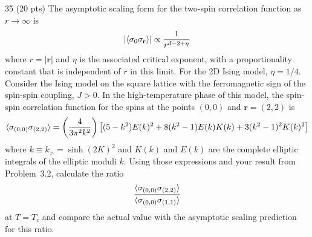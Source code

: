 \begin{hwproblem}{3}{5}
(20 pts) The asymptotic scaling form for the two-spin correlation function as $r\to\infty$ is
\begin{equation}
  |\langle \sigma_0\sigma_{\mathbf r}\rangle|\propto\frac{1}{r^{d-2+\eta}}
\end{equation}
where $r = |\mathbf r|$ and $\eta$ is the associated critical exponent, with a proportionality constant that is
independent of $r$ in this limit. For the 2D Ising model, $\eta = 1/4$. Consider the Ising model on the square lattice
with the ferromagnetic sign of the spin-spin coupling, $J>0$. In the high-temperature phase of this model, the
spin-spin correlation function for the spins at the points $(0,0)$ and $\mathbf r = (2,2)$ is
\begin{equation}
  \langle \sigma_{(0,0)}\sigma_{(2,2)}\rangle = \left(\frac{4}{3\pi^2k^2}\right)
  \left[(5-k^2)E(k)^2+8(k^2-1)E(k)K(k)+3(k^2-1)^2K(k)^2\right]
\end{equation}
where $k\equiv k_> = \sinh(2K)^2$ and $K(k)$ and $E(k)$ are the complete elliptic integrals of the elliptic moduli
$k$. Using those expressions and your result from Problem~3.2, calculate the ratio
\begin{equation}
  \frac{\langle \sigma_{(0,0)}\sigma_{(2,2)}\rangle}{\langle \sigma_{(0,0)}\sigma_{(1,1)}\rangle}
\end{equation}
at $T = T_c$ and compare the actual value with the asymptotic scaling prediction for this ratio.
\end{hwproblem}

